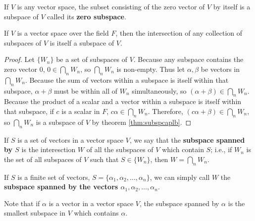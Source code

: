 \documentclass[12pt]{article}
\begin{document}
\begin{defn}
  If $V$ is any vector space, the subset consisting of the zero vector of $V$ by
  itself is a subspace of $V$ called its \textbf{zero subspace}.
\end{defn}

\begin{thm}
  If $V$ is a vector space over the field $F$, then the intersection of any
  collection of subspaces of $V$ is itself a subspace of $V$.

  \begin{proof}
    Let $\{W_n\}$ be a set of subspaces of $V$. Because any subspace contains the
    zero vector $0$, $0 \in \bigcap_{n}W_n$, so $\bigcap_{n}W_n$ is non-empty. Thus
    let $\alpha,\beta$ be vectors in $\bigcap_{n}W_n$. Because the sum of vectors
    within a subspace is itself within that subspace, $\alpha + \beta$ must be within
    all of $W_n$ simultaneously, so $(\alpha + \beta) \in \bigcap_{n}W_n$. Because
    the product of a scalar and a vector within a subspace is itself within that
    subspace, if $c$ is a scalar in $F$, $c\alpha \in \bigcap_{n}W_n$. Therefore,
    $(c\alpha + \beta) \in \bigcap_{n}W_n$, so $\bigcap_{n}W_n$ is a subspace of $V$
    by theorem \ref{thm:subspcaplb}.
  \end{proof}
\end{thm}

\begin{defn}
  If $S$ is a set of vectors in a vector space $V$, we say that the \textbf{subspace
  spanned by $S$} is the interesction $W$ of all the subspaces of $V$ which contain
  $S$; i.e., if ${W_n}$ is the set of all subspaces of $V$ such that $S \in \{W_n\}$,
  then $W = \bigcap_{n}W_n$.

  If $S$ is a finite set of vectors, $S = \{\alpha_1,\alpha_2,\ldots,\alpha_n\}$, we
  can simply call $W$ the \textbf{subspace spanned by the vectors
  $\alpha_1,\alpha_2,\ldots,\alpha_n$}.
\end{defn}

\begin{comm}
  Note that if $\alpha$ is a vector in a vector space $V$, the subspace spanned by
  $\alpha$ is the smallest subspace in $V$ which contains $\alpha$.
\end{comm}
\end{document}
